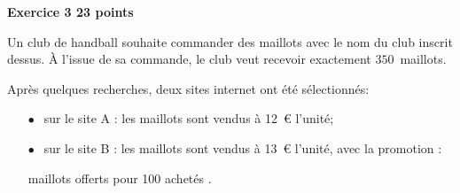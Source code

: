 \textbf{\large Exercice 3 \hfill 23 points}

\medskip

Un club de handball souhaite commander des maillots avec le nom du club inscrit dessus. À l'issue de sa commande, le club veut recevoir exactement $350$~maillots.

Après quelques recherches, deux sites internet ont été sélectionnés:

\setlength\parindent{1cm}
\begin{itemize}
\item[$\bullet~~$] sur le site A : les maillots sont vendus à 12~\euro{} l'unité;
\item[$\bullet~~$] sur le site B : les maillots sont vendus à 13~\euro{} l'unité, avec la promotion :

\begin{center} maillots offerts pour 100 achetés \fg.\end{center}
\end{itemize}
\setlength\parindent{0cm}


